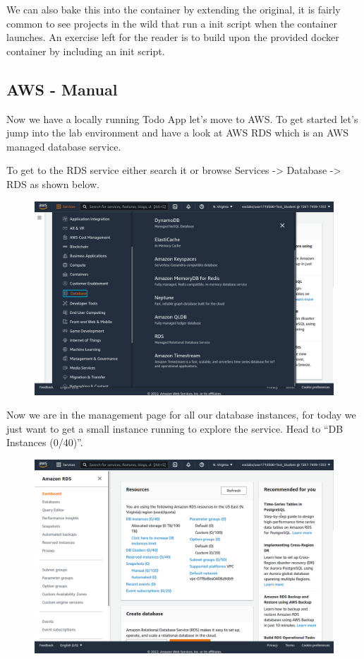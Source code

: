 \documentclass{csse4400}
\begin{document}
We can also bake this into the container by extending the original,
it is fairly common to see projects in the wild that run a init script when the container launches.
An exercise left for the reader is to build upon the provided docker container by including an init script.

\subsection{AWS - Manual}

Now we have a locally running Todo App let's move to AWS.
To get started let's jump into the lab environment and have a look at AWS RDS which is an AWS managed database service.


To get to the RDS service either search it or browse Services -> Database -> RDS as shown below.

\begin{figure}[H]
\includegraphics[width=\textwidth]{images/aws_1}
\end{figure}

Now we are in the management page for all our database instances,
for today we just want to get a small instance running to explore the service.
Head to ``DB Instances (0/40)''.

\begin{figure}[H]
\includegraphics[width=\textwidth]{images/aws_2}
\end{figure}
\end{document}

